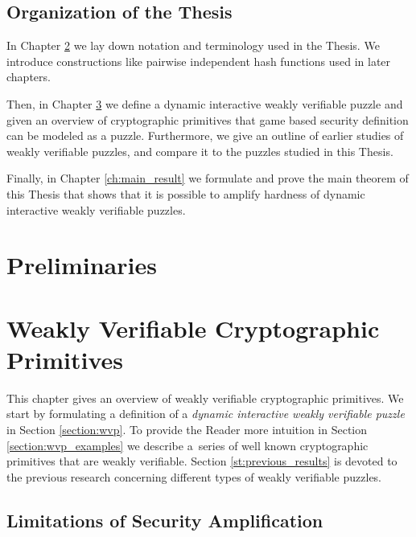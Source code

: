 \documentclass[11pt,a4paper,titlepage]{memoir}
\begin{document}
\section{Organization of the Thesis}
In Chapter \ref{ch:preliminaries} we lay down notation and terminology used in the Thesis.
We introduce constructions like pairwise independent hash functions used in later chapters.

Then, in Chapter \ref{ch:intro_weakly} we define a dynamic interactive weakly verifiable puzzle and
given an overview of cryptographic primitives that game based security definition can be modeled as
a puzzle. Furthermore, we give an outline of earlier studies of weakly verifiable puzzles, and
compare it to the puzzles studied in this Thesis.

Finally, in Chapter \ref{ch:main_result} we formulate and prove the main theorem of this Thesis that
shows that it is possible to amplify hardness of dynamic interactive weakly verifiable puzzles.

\chapter{Preliminaries}
\label{ch:preliminaries}


\chapter{Weakly Verifiable Cryptographic Primitives}
\label{ch:intro_weakly}
This chapter gives an overview of weakly verifiable cryptographic primitives.
We start by formulating a definition of a \textit{dynamic interactive weakly verifiable puzzle} in Section \ref{section:wvp}.
To provide the Reader more intuition in Section \ref{section:wvp_examples} we describe a~series of well known cryptographic primitives
that are weakly verifiable. Section \ref{st:previous_results} is devoted to the previous research concerning different types of weakly verifiable puzzles.
%



%
\section{Limitations of Security Amplification}
%
\end{document}
